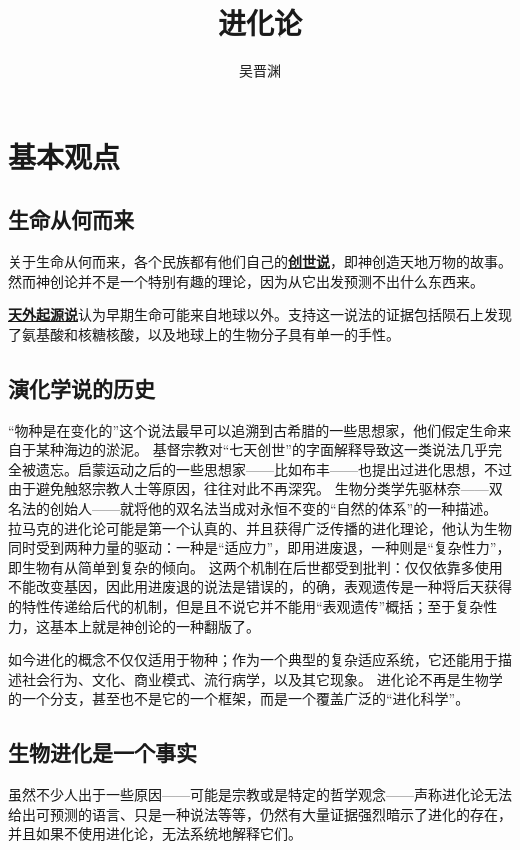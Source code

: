 \documentclass[hyperref, UTF8, a4paper, oneside]{ctexart}
\title{进化论}
\author{吴晋渊}
\newcommand*{\concept}[1]{\underline{\textbf{#1}}}
\numberwithin{equation}{section}
\begin{document}
\maketitle

\section{基本观点}

\subsection{生命从何而来}

关于生命从何而来，各个民族都有他们自己的\concept{创世说}，即神创造天地万物的故事。
然而神创论并不是一个特别有趣的理论，因为从它出发预测不出什么东西来。

\concept{天外起源说}认为早期生命可能来自地球以外。支持这一说法的证据包括陨石上发现了氨基酸和核糖核酸，以及地球上的生物分子具有单一的手性。

\subsection{演化学说的历史}

“物种是在变化的”这个说法最早可以追溯到古希腊的一些思想家，他们假定生命来自于某种海边的淤泥。
基督宗教对“七天创世”的字面解释导致这一类说法几乎完全被遗忘。启蒙运动之后的一些思想家——比如布丰——也提出过进化思想，不过由于避免触怒宗教人士等原因，往往对此不再深究。
生物分类学先驱林奈——双名法的创始人——就将他的双名法当成对永恒不变的“自然的体系”的一种描述。
拉马克的进化论可能是第一个认真的、并且获得广泛传播的进化理论，他认为生物同时受到两种力量的驱动：一种是“适应力”，即用进废退，一种则是“复杂性力”，即生物有从简单到复杂的倾向。
这两个机制在后世都受到批判：仅仅依靠多使用不能改变基因，因此用进废退的说法是错误的，的确，表观遗传是一种将后天获得的特性传递给后代的机制，但是且不说它并不能用“表观遗传”概括；至于复杂性力，这基本上就是神创论的一种翻版了。

如今进化的概念不仅仅适用于物种；作为一个典型的复杂适应系统，它还能用于描述社会行为、文化、商业模式、流行病学，以及其它现象。
进化论不再是生物学的一个分支，甚至也不是它的一个框架，而是一个覆盖广泛的“进化科学”。

\subsection{生物进化是一个事实}

虽然不少人出于一些原因——可能是宗教或是特定的哲学观念——声称进化论无法给出可预测的语言、只是一种说法等等，仍然有大量证据强烈暗示了进化的存在，并且如果不使用进化论，无法系统地解释它们。
\end{document}
